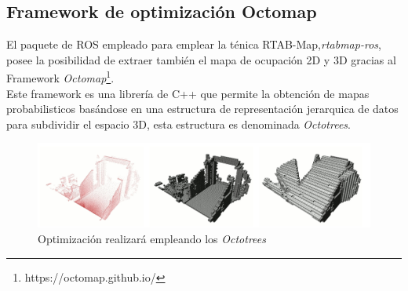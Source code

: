 \subsection{Framework de optimización Octomap}
El paquete de ROS empleado para emplear la ténica RTAB-Map,\textit{rtabmap-ros}, posee la posibilidad de extraer también el mapa de ocupación 2D y 3D gracias al Framework 
\textit{Octomap}\footnote{https://octomap.github.io/}. \\
Este framework es una librería de C++ que permite la obtención de mapas probabilisticos basándose en una estructura de representación jerarquica de datos para subdividir
el espacio 3D, esta estructura es denominada \textit{Octotrees}. \\

\begin{figure}[h!]
    \centering
    \includegraphics[width=.9\textwidth]{images/octomap_beauty}
    \caption{Optimización realizará empleando los \textit{Octotrees}}
\end{figure}


